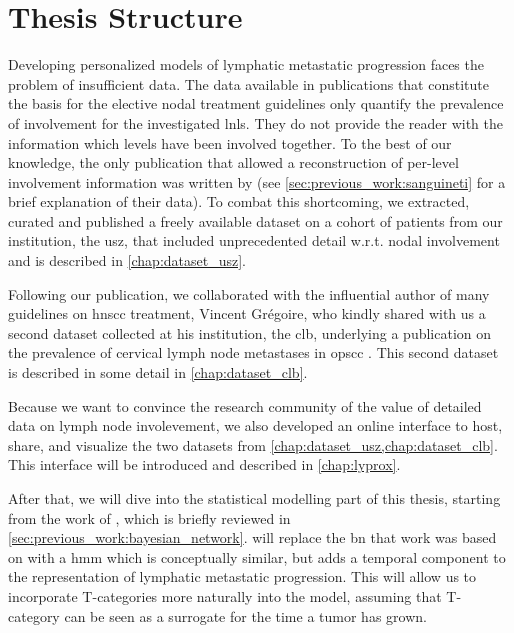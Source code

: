 \documentclass[\relativeRoot/main.tex]{subfiles}
\begin{document}
\section{Thesis Structure}
\label{sec:intro:structure}

Developing personalized models of lymphatic metastatic progression faces the problem of insufficient data. The data available in publications that constitute the basis for the elective nodal treatment guidelines only quantify the prevalence of involvement for the investigated \glspl{lnl}. They do not provide the reader with the information which levels have been involved together. To the best of our knowledge, the only publication that allowed a reconstruction of per-level involvement information was written by  (see \cref{sec:previous_work:sanguineti} for a brief explanation of their data). To combat this shortcoming, we extracted, curated and published a freely available dataset on a cohort of patients from our institution, the \gls{usz}, that included unprecedented detail w.r.t. nodal involvement and is described in \cref{chap:dataset_usz}.

Following our publication, we collaborated with the influential author of many guidelines on \gls{hnscc} treatment, Vincent Grégoire, who kindly shared with us a second dataset collected at his institution, the \gls{clb}, underlying a publication on the prevalence of cervical lymph node metastases in \gls{opscc} \cite{bauwens_prevalence_2021}. This second dataset is described in some detail in \cref{chap:dataset_clb}.

Because we want to convince the research community of the value of detailed data on lymph node involevement, we also developed an online interface to host, share, and visualize the two datasets from \cref{chap:dataset_usz,chap:dataset_clb}. This interface will be introduced and described in \cref{chap:lyprox}.

After that, we will dive into the statistical modelling part of this thesis, starting from the work of , which is briefly reviewed in \cref{sec:previous_work:bayesian_network}.  will replace the \gls{bn} that work was based on with a \gls{hmm} which is conceptually similar, but adds a temporal component to the representation of lymphatic metastatic progression. This will allow us to incorporate T-categories more naturally into the model, assuming that T-category can be seen as a surrogate for the time a tumor has grown.
\end{document}
